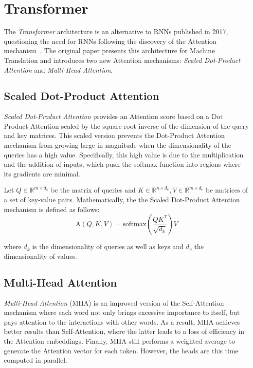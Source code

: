 
\section{Transformer}
\label{sec:transformer}

The \emph{Transformer} architecture is an alternative to RNNs published in 2017,
questioning the need for RNNs following the discovery of the Attention
mechanism~\citep{vaswani:attention}. The original paper presents this
architecture for Machine Translation and introduces two new Attention
mechanisms: \emph{Scaled Dot-Product Attention} and \emph{Multi-Head Attention}.

\subsection{Scaled Dot-Product Attention}
\label{subsec:transformer:scaled:dot-prodct:attention}

\emph{Scaled Dot-Product Attention} provides an Attention score based on a Dot
Product Attention scaled by the square root inverse of the dimension of the
query and key matrices. This scaled version prevents the Dot-Product Attention
mechanism from growing large in magnitude when the dimensionality of the queries
has a high value. Specifically, this high value is due to the multiplication and
the addition of inputs, which push the softmax function into regions where its
gradients are minimal.
\begin{definition}
  Let $Q \in \mathbb{R}^{m\times d_k}$ be the matrix of queries and $K \in
  \mathbb{R}^{n\times d_k}, V \in \mathbb{R}^{m\times d_v}$ be matrices of a set
  of key-value pairs. Mathematically, the the Scaled Dot-Product Attention
  mechanism is defined as follows:
  \begin{equation}
    \mathrm{A}(Q, K, V) = \mathrm{softmax}\left(\frac{QK^T}{\sqrt{d_k}}\right)V
    \label{eq:def:scaled:dot-product:attention}
  \end{equation}

  where $d_k$ is the dimensionality of queries as well as keys and $d_v$ the
  dimensionality of values.
\end{definition}

\subsection{Multi-Head Attention}
\label{subsec:transformer:multi-head:attention}

\emph{Multi-Head Attention} (MHA) is an improved version of the Self-Attention
mechanism where each word not only brings excessive importance to itself, but
pays attention to the interactions with other words. As a result, MHA achieves
better results than Self-Attention, where the latter leads to a loss of
efficiency in the Attention embeddings. Finally, MHA still performs a weighted
average to generate the Attention vector for each token. However, the heads are
this time computed in parallel.

